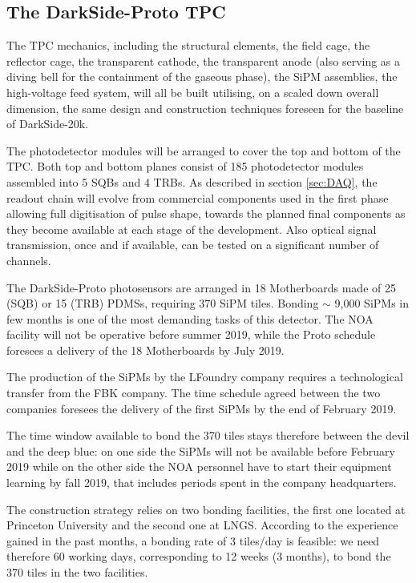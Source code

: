 \subsection{The DarkSide-Proto TPC}

The TPC mechanics, including the structural elements, the field cage, the reflector cage, the transparent cathode, the transparent anode (also serving as a diving bell for the containment of the gaseous phase), the SiPM assemblies, the high-voltage feed system, will all be built utilising, on a scaled down overall dimension, the same design and construction techniques foreseen for the baseline of DarkSide-20k. 

The photodetector modules will be arranged to cover the top and bottom of the TPC. Both top and bottom planes consist of 185 photodetector modules assembled into 5 SQBs and 4 TRBs. As described in section \ref{sec:DAQ}, the readout chain will evolve from commercial components used in the first phase allowing full digitisation of pulse shape, towards the planned final components as they become available at each stage of the development. Also optical signal transmission, once and if available, can be tested on a significant number of channels. 

The DarkSide-Proto photosensors are arranged in 18 Motherboards made of 25 (SQB) or 15 (TRB) PDMSs, requiring 370 SiPM tiles. Bonding $\sim$ 9,000 SiPMs in few months is one of the most demanding tasks of this detector. The NOA facility will not be operative before summer 2019, while the Proto schedule foresees a delivery of the 18 Motherboards by July 2019.

The production of the SiPMs by the LFoundry company requires a technological transfer from the FBK company. The time schedule agreed between the two companies foresees the delivery of the first SiPMs by the end of February 2019.

The time window available to bond the 370 tiles stays therefore between the devil and the deep blue: on one side the SiPMs will not be available before February 2019 while on the other side the NOA personnel have to start their equipment learning by fall 2019, that includes periods spent in the company headquarters.

The construction strategy relies on two bonding facilities, the first one located at Princeton University and the second one at LNGS. According to the experience gained in the past months, a bonding rate of 3 tiles/day is feasible: we need therefore 60 working days, corresponding to 12 weeks (3 months), to bond the 370 tiles  in the two facilities.

